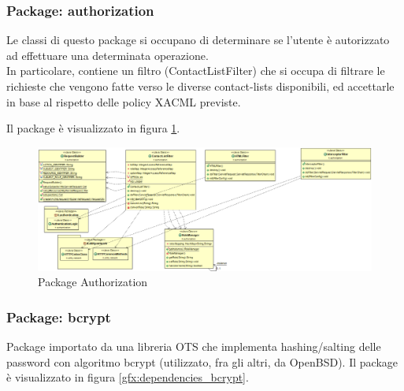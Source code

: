 \subsubsection{Package: \textbf{authorization}}

Le classi di questo package si occupano di determinare se l’utente è autorizzato ad effettuare una determinata operazione.\\
In particolare, contiene un filtro (ContactListFilter) che si occupa di filtrare le richieste che vengono fatte verso le diverse contact-lists disponibili, ed accettarle in base al rispetto delle policy XACML previste.

Il package è visualizzato in figura \ref{gfx:dependencies_authorization}.

\begin{figure}[!htbp]
	\centering
	\includegraphics[scale = .3]{img/dependencies_authorization}
	\caption{Package Authorization}
	\label{gfx:dependencies_authorization}
\end{figure}

\subsubsection{Package: \textbf{bcrypt}}

Package importato da una libreria OTS che implementa hashing/salting delle password con algoritmo bcrypt (utilizzato, fra gli altri, da OpenBSD). 
Il package è visualizzato in figura \ref{gfx:dependencies_bcrypt}.

